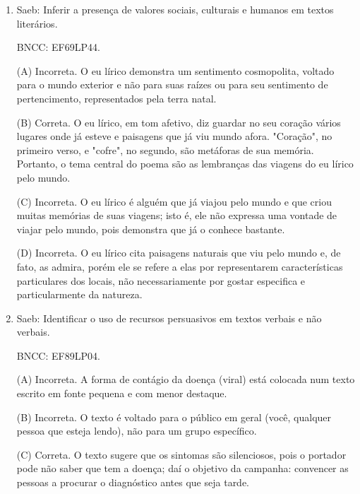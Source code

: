 \begin{enumerate}
(B) Incorreta. O termo não retoma elemento anterior a ele citado no
texto, não é anafórico.

(C) Incorreta. O termo não retoma elemento ainda a ser citado no texto.

(D) Incorreta. O termo não remete a algo que pertença ao sujeito enunciador da fala.

\item


Saeb: Inferir a presença de valores sociais, culturais e humanos em
textos literários.

BNCC: EF69LP44.

(A) Incorreta. O eu lírico demonstra um sentimento cosmopolita, voltado
para o mundo exterior e não para suas raízes ou para seu sentimento de
pertencimento, representados pela terra natal.

(B) Correta. O eu lírico, em tom afetivo, diz guardar no seu coração
vários lugares onde já esteve e paisagens que já viu mundo afora.
"Coração", no primeiro verso, e "cofre", no segundo, são metáforas de sua
memória. Portanto, o tema central do poema são as lembranças das viagens
do eu lírico pelo mundo.

(C) Incorreta. O eu lírico é alguém que já viajou pelo mundo e que criou
muitas memórias de suas viagens; isto é, ele não expressa uma vontade de
viajar pelo mundo, pois demonstra que já o conhece bastante.

(D) Incorreta. O eu lírico cita paisagens naturais que viu pelo mundo e,
de fato, as admira, porém ele se refere a elas por representarem
características particulares dos locais, não necessariamente por gostar
especifica e particularmente da natureza.

\item


Saeb: Identificar o uso de recursos persuasivos em textos verbais e não
verbais.

BNCC: EF89LP04.

(A) Incorreta. A forma de contágio da doença (viral) está colocada num
texto escrito em fonte pequena e com menor destaque.

(B) Incorreta. O texto é voltado para o público em geral (você, qualquer
pessoa que esteja lendo), não para um grupo específico.

(C) Correta. O texto sugere que os sintomas são silenciosos, pois o
portador pode não saber que tem a doença; daí o objetivo da campanha:
convencer as pessoas a procurar o diagnóstico antes que seja tarde.


\end{enumerate}
